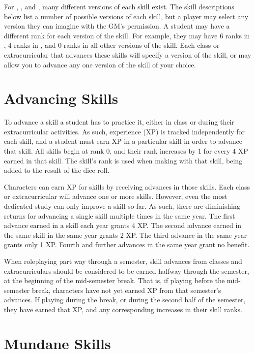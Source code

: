 For , , and , many different versions of each skill exist.
The skill descriptions below list a number of possible versions of each skill, but a player may select any version they can imagine with the GM's permission.
A student may have a different rank for each version of the skill.
For example, they may have 6 ranks in , 4 ranks in , and 0 ranks in all other versions of the skill.
Each class or extracurricular that advances these skills will specify a version of the skill, or may allow you to advance any one version of the skill of your choice.

\section{Advancing Skills}

To advance a skill a student has to practice it, either in class or during their extracurricular activities.
As such, experience (XP) is tracked independently for each skill, and a student must earn XP in a particular skill in order to advance that skill.
All skills begin at rank 0, and their rank increases by 1 for every 4 XP earned in that skill.
The skill's rank is used when making {\tests} with that skill, being added to the result of the dice roll.

Characters can earn XP for skills by receiving advances in those skills.
Each class or extracurricular will advance one or more skills.
However, even the most dedicated study can only improve a skill so far.
As such, there are diminishing returns for advancing a single skill multiple times in the same year.
The first advance earned in a skill each year grants 4 XP.
The second advance earned in the same skill in the same year grants 2 XP.
The third advance in the same year grants only 1 XP.
Fourth and further advances in the same year grant no benefit.

When roleplaying part way through a semester, skill advances from classes and extracurriculars should be considered to be earned halfway through the semester, at the beginning of the mid-semester break.
That is, if playing before the mid-semester break, characters have not yet earned XP from that semester's advances.
If playing during the break, or during the second half of the semester, they have earned that XP, and any corresponding increases in their skill ranks.

\section{Mundane Skills}

